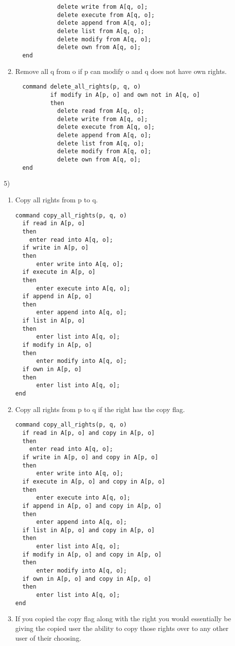 \documentclass[journal,onecolumn]{IEEEtran}
\begin{document}
\begin{enumerate}
\begin{enumerate}
\begin{lstlisting}
            delete write from A[q, o];
            delete execute from A[q, o];
            delete append from A[q, o];
            delete list from A[q, o];
            delete modify from A[q, o];
            delete own from A[q, o];
  end
\end{lstlisting}
\item Remove all q from o if p can modify o and q does not have own rights.
\begin{lstlisting}
  command delete_all_rights(p, q, o)
          if modify in A[p, o] and own not in A[q, o]
          then 
            delete read from A[q, o];
            delete write from A[q, o];
            delete execute from A[q, o];
            delete append from A[q, o];
            delete list from A[q, o];
            delete modify from A[q, o];
            delete own from A[q, o];
  end
\end{lstlisting}
    \end{enumerate}
  \item [5)]
    \begin{enumerate} 
\item Copy all rights from p to q.
\begin{lstlisting}
command copy_all_rights(p, q, o)
  if read in A[p, o]
  then
    enter read into A[q, o];
  if write in A[p, o]
  then
      enter write into A[q, o];
  if execute in A[p, o]
  then
      enter execute into A[q, o];
  if append in A[p, o]
  then
      enter append into A[q, o];
  if list in A[p, o]
  then
      enter list into A[q, o];
  if modify in A[p, o]
  then
      enter modify into A[q, o];
  if own in A[p, o]
  then
      enter list into A[q, o];
end
\end{lstlisting}
\item Copy all rights from p to q if the right has the copy flag.
\begin{lstlisting}
command copy_all_rights(p, q, o)
  if read in A[p, o] and copy in A[p, o]
  then
    enter read into A[q, o];
  if write in A[p, o] and copy in A[p, o]
  then
      enter write into A[q, o];
  if execute in A[p, o] and copy in A[p, o]
  then
      enter execute into A[q, o];
  if append in A[p, o] and copy in A[p, o]
  then
      enter append into A[q, o];
  if list in A[p, o] and copy in A[p, o]
  then
      enter list into A[q, o];
  if modify in A[p, o] and copy in A[p, o]
  then
      enter modify into A[q, o];
  if own in A[p, o] and copy in A[p, o]
  then
      enter list into A[q, o];
end
\end{lstlisting}
\item If you copied the copy flag along with the right you would essentially be giving the copied user the ability to copy those rights over to any other user of their choosing. 

\end{enumerate}
\end{enumerate}
\end{document}
